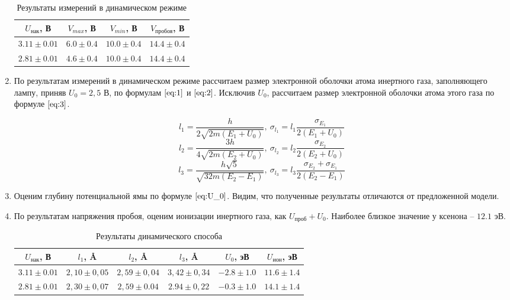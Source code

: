 \begin{enumerate}
    \begin{table}[h!]
        \centering
        \begin{tabular}{|c|c|c|c|}
        \hline
        $U_{\text{нак}}$, В & $V_{max}$, В & $V_{min}$, В & $V_{\text{пробоя}}$, В \\ \hline
        $3.11 \pm 0.01$ & $6.0 \pm 0.4$ & $10.0 \pm 0.4$ & $14.4 \pm 0.4$    \\ \hline
        $2.81 \pm 0.01$ & $4.6 \pm 0.4$ & $10.0 \pm 0.4$ & $14.4 \pm 0.4$    \\ \hline
        \end{tabular}
        \caption{Результаты измерений в динамическом режиме}
    \end{table}

    \item По результатам измерений в динамическом режиме рассчитаем размер электронной оболочки атома инертного газа, заполняющего лампу, 
    приняв $U_0 = 2,5 \text{ В}$, по формулам $\eqref{eq:1}$ и $\eqref{eq:2}$. Исключив $U_0$, рассчитаем размер электронной оболочки атома этого газа по формуле $\eqref{eq:3}$.

    \[ l_1 = \frac{h}{2\sqrt{2m(E_1+U_0)}}, ~\sigma_{l_1} = l_1 \frac{\sigma_{E_1}}{2(E_1 + U_0)}\]
    \[ l_2 = \frac{3h}{4\sqrt{2m(E_2+U_0)}}, ~\sigma_{l_2} = l_2 \frac{\sigma_{E_2}}{2(E_2 + U_0)}\]
    \[ l_3 = \frac{h\sqrt{5}}{\sqrt{32m(E_2-E_1)}}, ~\sigma_{l_3} = l_3 \frac{\sigma_{E_2} + \sigma_{E_1}}{2(E_2 - E_1)}\]

    \item Оценим глубину потенциальной ямы по формуле $\eqref{eq:U_0}$. Видим, что полученные результаты отличаются от предложенной модели. 
    \item По результатам напряжения пробоя, оценим ионизации инертного газа, как $U_{проб} +  U_0$. Наиболее близкое значение у ксенона -- $12.1 \text{ эВ}$.
    \begin{table}[h!]
        \centering
        \begin{tabular}{|c|c|c|c|c|c|}
        \hline
        $U_{\text{нак}}$, В & $l_1$, \AA      & $l_2$, \AA      & $l_3$, \AA      & $U_0$, эВ & $U_{ион}$,  эВ \\ \hline
        $3.11 \pm 0.01$    & $2,10 \pm 0,05$ & $2,59 \pm 0,04$ & $3,42 \pm 0,34$ & $ -2.8 \pm 1.0 $ & $11.6 \pm 1.4$ \\ \hline
        $2.81 \pm 0.01$    & $2,30 \pm 0,07$ & $2,59 \pm 0.04$ & $2.94 \pm 0,22$ & $ -0.3 \pm 1.0 $  & $14.1 \pm 1.4$ \\ \hline
        \end{tabular}
        \caption{Результаты динамического способа}
    \end{table}
     
\end{enumerate}

